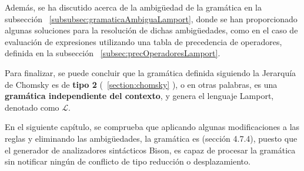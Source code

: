 Además, se ha discutido acerca de la ambigüedad de la gramática en la subsección ~\ref{subsubsec:gramaticaAmbiguaLamport}, donde se han proporcionado algunas soluciones para la resolución de dichas ambigüedades, como en el caso de evaluación de expresiones utilizando una tabla de precedencia de operadores, definida en la subsección ~\ref{subsec:precOperadoresLamport}.



Para finalizar, se puede concluir que la gramática definida siguiendo la Jerarquía de Chomsky es de \textbf{tipo 2} (~\ref{section:chomsky} ), o en otras palabras, es una \textbf{gramática independiente del contexto}, y genera el lenguaje Lamport, denotado como $\mathscr{L}$.



En el siguiente capítulo, se comprueba que aplicando algunas modificaciones a las reglas y eliminando las ambigüedades, la gramática es  \cite{aho1990compiladores} (sección 4.7.4), puesto que el generador de analizadores sintácticos Bison, es capaz de procesar la gramática sin notificar ningún de conflicto de tipo reducción o desplazamiento.

